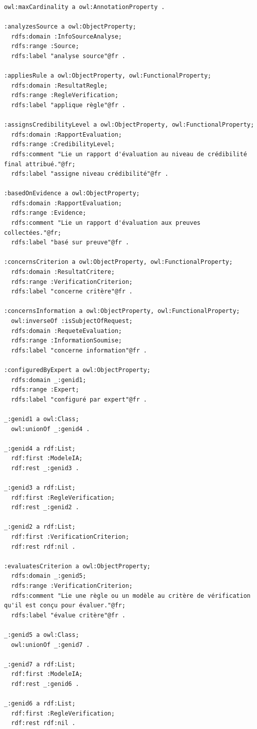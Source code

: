 \documentclass[9pt,twocolumn,french]{article}
\begin{document}
\begin{lstlisting}[language=Turtle,basicstyle=\ttfamily\tiny,frame=single]
owl:maxCardinality a owl:AnnotationProperty .

:analyzesSource a owl:ObjectProperty;
  rdfs:domain :InfoSourceAnalyse;
  rdfs:range :Source;
  rdfs:label "analyse source"@fr .

:appliesRule a owl:ObjectProperty, owl:FunctionalProperty;
  rdfs:domain :ResultatRegle;
  rdfs:range :RegleVerification;
  rdfs:label "applique règle"@fr .

:assignsCredibilityLevel a owl:ObjectProperty, owl:FunctionalProperty;
  rdfs:domain :RapportEvaluation;
  rdfs:range :CredibilityLevel;
  rdfs:comment "Lie un rapport d'évaluation au niveau de crédibilité final attribué."@fr;
  rdfs:label "assigne niveau crédibilité"@fr .

:basedOnEvidence a owl:ObjectProperty;
  rdfs:domain :RapportEvaluation;
  rdfs:range :Evidence;
  rdfs:comment "Lie un rapport d'évaluation aux preuves collectées."@fr;
  rdfs:label "basé sur preuve"@fr .

:concernsCriterion a owl:ObjectProperty, owl:FunctionalProperty;
  rdfs:domain :ResultatCritere;
  rdfs:range :VerificationCriterion;
  rdfs:label "concerne critère"@fr .

:concernsInformation a owl:ObjectProperty, owl:FunctionalProperty;
  owl:inverseOf :isSubjectOfRequest;
  rdfs:domain :RequeteEvaluation;
  rdfs:range :InformationSoumise;
  rdfs:label "concerne information"@fr .

:configuredByExpert a owl:ObjectProperty;
  rdfs:domain _:genid1;
  rdfs:range :Expert;
  rdfs:label "configuré par expert"@fr .

_:genid1 a owl:Class;
  owl:unionOf _:genid4 .

_:genid4 a rdf:List;
  rdf:first :ModeleIA;
  rdf:rest _:genid3 .

_:genid3 a rdf:List;
  rdf:first :RegleVerification;
  rdf:rest _:genid2 .

_:genid2 a rdf:List;
  rdf:first :VerificationCriterion;
  rdf:rest rdf:nil .

:evaluatesCriterion a owl:ObjectProperty;
  rdfs:domain _:genid5;
  rdfs:range :VerificationCriterion;
  rdfs:comment "Lie une règle ou un modèle au critère de vérification qu'il est conçu pour évaluer."@fr;
  rdfs:label "évalue critère"@fr .

_:genid5 a owl:Class;
  owl:unionOf _:genid7 .

_:genid7 a rdf:List;
  rdf:first :ModeleIA;
  rdf:rest _:genid6 .

_:genid6 a rdf:List;
  rdf:first :RegleVerification;
  rdf:rest rdf:nil .


\end{lstlisting}
\end{document}
